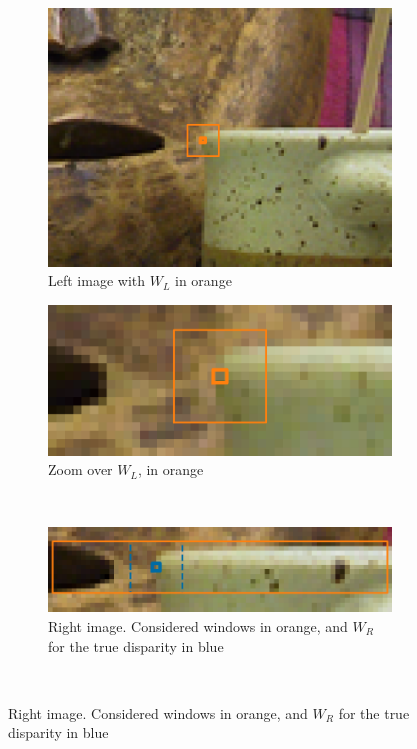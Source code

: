 \begin{figure}
    \begin{subfigure}[t]{0.35\linewidth}
        \flushleft
        \includegraphics[width=\linewidth]{Images/Chap_1/adherence_overview_left.png}
        \caption{Left image with $W_L$ in orange}
        \label{fig:adherence_overview_left}
    \end{subfigure}\hfill
    \begin{subfigure}[t]{0.6\linewidth}
        \flushright
        \includegraphics[width=\linewidth]{Images/Chap_1/adherence_left.png}
        \caption{Zoom over $W_L$, in orange}
        \label{fig:adherence_left}
    \end{subfigure}\\
    \begin{subfigure}[t]{\linewidth}
        \flushright
        \includegraphics[width=0.87\linewidth]{Images/Chap_1/adherence_right.png}
        \caption{Right image. Considered windows in orange, and $W_R$ for the true disparity in blue}
        \label{fig:adherence_right}
    \end{subfigure}\\
    

\end{figure}

